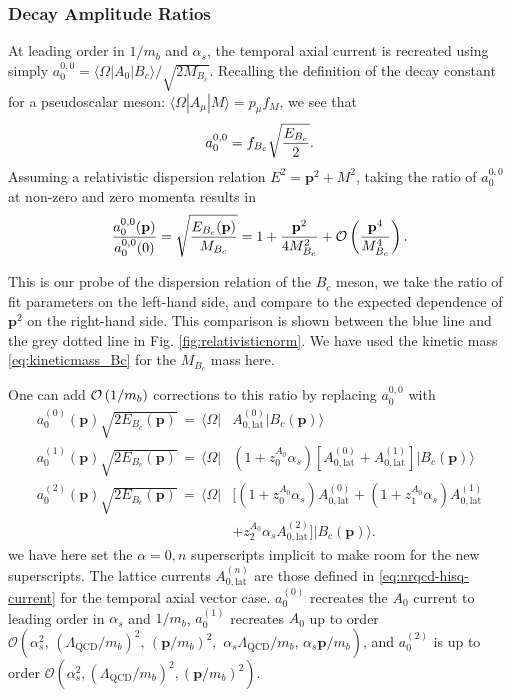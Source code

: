 \subsubsection{Decay Amplitude Ratios}

At leading order in $1/m_b$ and $\alpha_s$, the temporal axial current is recreated using simply $a_0^{0,0} = \langle \Omega | A_0 | B_c \rangle /\sqrt{2M_{B_c}}$. Recalling the definition of the decay constant for a pseudoscalar meson: $\langle \Omega | A_{\mu} | M \rangle = p_{\mu} f_{M}$, we see that
\begin{align}
  a_0^{0,0} = f_{B_c}\sqrt{ E_{B_c} \over 2 }.
\end{align}
Assuming a relativistic dispersion relation $E^2={\textbf{p}}^2+M^2$, taking the ratio of $a_0^{0,0}$ at non-zero and zero momenta results in
\begin{align}
  {a_0^{0,0}({\textbf{p}})\over a_0^{0,0}(0)} = \sqrt{ E_{B_c}({\textbf{p}})\over M_{B_c}} = 1 + {{\textbf{p}}^2\over 4M_{B_c}^2} + \mathcal{O}\left( {\textbf{p}}^4\over M_{B_c}^4 \right).
\end{align}

This is our probe of the dispersion relation of the $B_c$ meson, we take the ratio of fit parameters on the left-hand side, and compare to the expected dependence of ${\textbf{p}}^2$ on the right-hand side. This comparison is shown between the blue line and the grey dotted line in Fig. \ref{fig:relativisticnorm}. We have used the kinetic mass \eqref{eq:kineticmass_Bc} for the $M_{B_c}$ mass here.

One can add $\mathcal{O}\left( 1/m_b \right)$ corrections to this ratio by replacing $a_0^{0,0}$ with
\begin{align}
  \nonumber
  \label{eq:a_0corrections}
  a_0^{(0)}({\textbf{p}}) \sqrt{2E_{B_c}({\textbf{p}})} \,=\, \langle \Omega |& A_{0,\text{lat}}^{(0)} | B_c  ({\textbf{p}}) \rangle \\
  \nonumber
  a_0^{(1)}({\textbf{p}}) \sqrt{2E_{B_c}({\textbf{p}})} \,=\, \langle \Omega |& (1+z^{A_0}_0 \alpha_s ) \left[A_{0,\text{lat}}^{(0)} +  A_{0,\text{lat}}^{(1)} \right] | B_c({\textbf{p}}) \rangle \\
  \nonumber
  a_0^{(2)}({\textbf{p}}) \sqrt{2E_{B_c}({\textbf{p}})} \,=\, \langle \Omega |& \big[ (1+z^{A_0}_0 \alpha_s ) A_{0,\text{lat}}^{(0)} + (1 + z^{A_0}_1\alpha_s) A_{0,\text{lat}}^{(1)} \\ &+ z^{A_0}_2\alpha_s A_{0,\text{lat}}^{(2)}  \big] | B_c({\textbf{p}})\rangle.
\end{align}
we have here set the $\alpha=0,n$ superscripts implicit to make room for the new superscripts. The lattice currents $A_{0,\text{lat}}^{(n)}$ are those defined in \ref{eq:nrqcd-hisq-current} for the temporal axial vector case. $a_0^{(0)}$ recreates the $A_0$ current to leading order in $\alpha_s$ and $1/m_b$, $a_0^{(1)}$ recreates $A_0$ up to order $\mathcal{O}(\alpha_s^2, \,(\Lambda_{\text{QCD}}/m_b)^2,\, ({\textbf{p}}/m_b)^2,\,\,\alpha_s \Lambda_{\text{QCD}} / m_b,\, \alpha_s {\textbf{p}}/m_b )$, and $a_0^{(2)}$ is up to order $\mathcal{O}( \alpha_s^2, (\Lambda_{\text{QCD}}/m_b)^2, ({\textbf{p}}/m_b)^2 )$.

